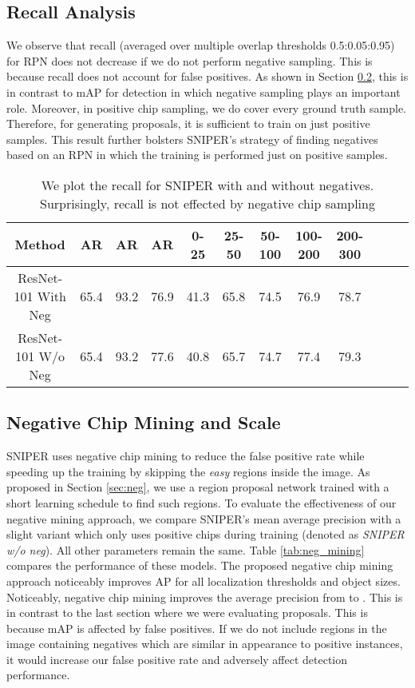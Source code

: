 \documentclass{article}
\begin{document}
\subsection{Recall Analysis}
We observe that recall (averaged over multiple overlap thresholds 0.5:0.05:0.95) for RPN does not decrease if we do not perform negative sampling. This is because recall does not account for false positives. As shown in Section \ref{sec:neg_mining}, this is in contrast to mAP for detection in which negative sampling plays an important role. Moreover, in positive chip sampling, we do cover every ground truth sample. Therefore, for generating proposals, it is sufficient to train on just positive samples. This result further bolsters SNIPER's strategy of finding negatives based on an RPN  in which the training is performed just on positive samples. 

\begin{table}[t]
\begin{center}
\small
\setlength\tabcolsep{5pt}
\begin{tabular}{|c|c|c|c|c|c|c|c|c|c|c|c|}
  \hline
  Method & AR & AR & AR & 0-25 & 25-50 & 50-100  & 100-200 & 200-300\\
  \hline\hline
  ResNet-101 With Neg & 65.4 & 93.2 & 76.9 & 41.3 & 65.8 & 74.5 & 76.9 & 78.7 \\
  ResNet-101 W/o Neg & 65.4 & 93.2 & 77.6 & 40.8 & 65.7 & 74.7 & 77.4 & 79.3 \\
  \hline
 \end{tabular}
 \newline
 \caption{We plot the recall for SNIPER with and without negatives. Surprisingly, recall is not effected by negative chip sampling}
\label{tab:rpn_bbox}
\end{center}
\end{table}
\subsection{Negative Chip Mining and Scale}
\label{sec:neg_mining}
SNIPER uses negative chip mining to reduce the false positive rate while speeding up the training by skipping the \textit{easy} regions inside the image. As proposed in Section \ref{sec:neg}, we use a region proposal network trained with a short learning schedule to find such regions. To evaluate the effectiveness of our negative mining approach, we compare SNIPER's mean average precision with a slight variant which only uses positive chips during training (denoted as \textit{SNIPER w/o neg}). All other parameters remain the same. Table \ref{tab:neg_mining} compares the performance of these models. The proposed negative chip mining approach noticeably improves AP for all localization thresholds and object sizes. Noticeably, negative chip mining improves the average precision from  to . This is in contrast to the last section where we were evaluating proposals. This is because mAP is affected by false positives. If we do not include regions in the image containing negatives which are similar in appearance to positive instances, it would increase our false positive rate and adversely affect detection performance.
\end{document}
